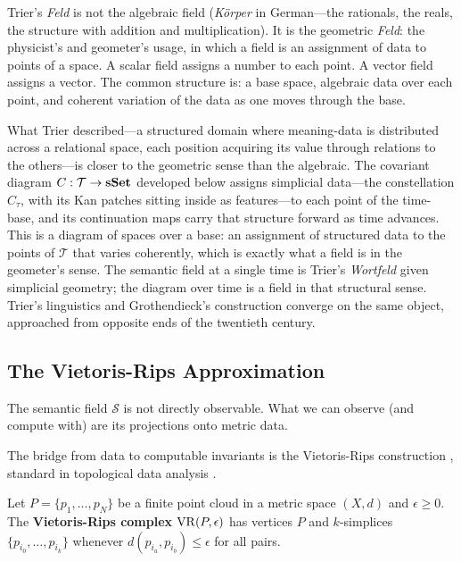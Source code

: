 \begin{remark}
\label{rem:field}
Trier's \emph{Feld} is not the algebraic field (\emph{K\"orper} in German---the rationals, the reals, the structure with addition and multiplication). It is the geometric \emph{Feld}: the physicist's and geometer's usage, in which a field is an assignment of data to points of a space. A scalar field assigns a number to each point. A vector field assigns a vector. The common structure is: a base space, algebraic data over each point, and coherent variation of the data as one moves through the base.

What Trier described---a structured domain where meaning-data is distributed across a relational space, each position acquiring its value through relations to the others---is closer to the geometric sense than the algebraic. The covariant diagram $C : \mathcal{T} \to \mathbf{sSet}$ developed below assigns simplicial data---the constellation $C_\tau$, with its Kan patches sitting inside as features---to each point of the time-base, and its continuation maps carry that structure forward as time advances. This is a diagram of spaces over a base: an assignment of structured data to the points of $\mathcal{T}$ that varies coherently, which is exactly what a field is in the geometer's sense. The semantic field at a single time is Trier's \emph{Wortfeld} given simplicial geometry; the diagram over time is a field in that structural sense. Trier's linguistics and Grothendieck's construction converge on the same object, approached from opposite ends of the twentieth century.
\end{remark}


\subsection{The Vietoris-Rips Approximation}

The semantic field $\mathcal{S}$ is not directly observable. What we can observe (and compute with) are its projections onto metric data.

The bridge from data to computable invariants is the Vietoris-Rips construction \cite{vietoris1927}, standard in topological data analysis \cite{carlsson2009topology, edelsbrunner2010}.

\begin{definition}
Let $P = \{p_1, \ldots, p_N\}$ be a finite point cloud in a metric space $(X, d)$ and $\epsilon \geq 0$. The \textbf{Vietoris-Rips complex} $\mathrm{VR}(P, \epsilon)$ has vertices $P$ and $k$-simplices $\{p_{i_0}, \ldots, p_{i_k}\}$ whenever $d(p_{i_a}, p_{i_b}) \leq \epsilon$ for all pairs.
\end{definition}

